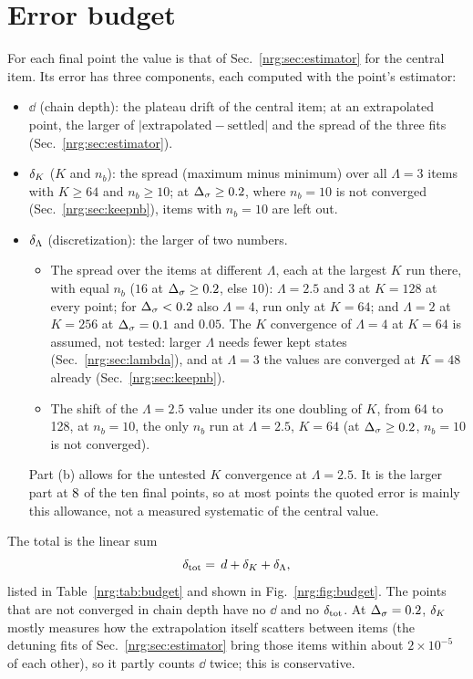 \section{Error budget}\label{nrg:sec:budget}
For each final point the value is that of Sec.~\ref{nrg:sec:estimator} for the central item. Its error has three components, each computed
with the point's estimator:
\begin{itemize}
\item $\dd$ (chain depth): the plateau drift of the central item; at an extrapolated point, the larger of $|\text{extrapolated}-
  \text{settled}|$ and the spread of the three fits (Sec.~\ref{nrg:sec:estimator}).
\item $\delta_K$ ($K$ and $n_b$): the spread (maximum minus minimum) over all $\Lambda=3$ items with $K\ge64$ and $n_b\ge10$; at $\Delta_\sigma\ge0.2$,
  where $n_b=10$ is not converged (Sec.~\ref{nrg:sec:keepnb}), items with $n_b=10$ are left out.
\item $\delta_\Lambda$ (discretization): the larger of two numbers.
  \begin{itemize}
  \item[(a)] The spread over the items at different $\Lambda$, each at the largest $K$ run there, with equal $n_b$ ($16$ at $\Delta_\sigma\ge0.2$,
    else $10$): $\Lambda=2.5$ and $3$ at $K=128$ at every point; for $\Delta_\sigma<0.2$ also $\Lambda=4$, run only at $K=64$; and $\Lambda=2$ at
    $K=256$ at $\Delta_\sigma=0.1$ and $0.05$. The $K$ convergence of $\Lambda=4$ at $K=64$ is assumed, not tested: larger $\Lambda$ needs
    fewer kept states (Sec.~\ref{nrg:sec:lambda}), and at $\Lambda=3$ the values are converged at $K=48$ already (Sec.~\ref{nrg:sec:keepnb}).
  \item[(b)] The shift of the $\Lambda=2.5$ value under its one doubling of $K$, from 64 to 128, at $n_b=10$, the only $n_b$ run at
    $\Lambda=2.5$, $K=64$ (at $\Delta_\sigma\ge0.2$, $n_b=10$ is not converged).
  \end{itemize}
  Part (b) allows for the untested $K$ convergence at $\Lambda=2.5$. It is the larger part at $8$ of the ten final points,
  so at most points the quoted error is mainly this allowance, not a measured systematic of the central value.
\end{itemize}
The total is the linear sum
\begin{equation}
\delta_{\rm tot}=\,d+\delta_K+\delta_\Lambda,\label{nrg:eq:budget}
\end{equation}
listed in Table~\ref{nrg:tab:budget} and shown in Fig.~\ref{nrg:fig:budget}. The points that are not converged in chain depth have no $\dd$
and no $\delta_{\rm tot}$. At $\Delta_\sigma=0.2$, $\delta_K$ mostly measures how the extrapolation itself scatters between items (the detuning fits of
Sec.~\ref{nrg:sec:estimator} bring those items within about $2\times10^{-5}$ of each other), so it partly counts $\dd$ twice; this is
conservative.

